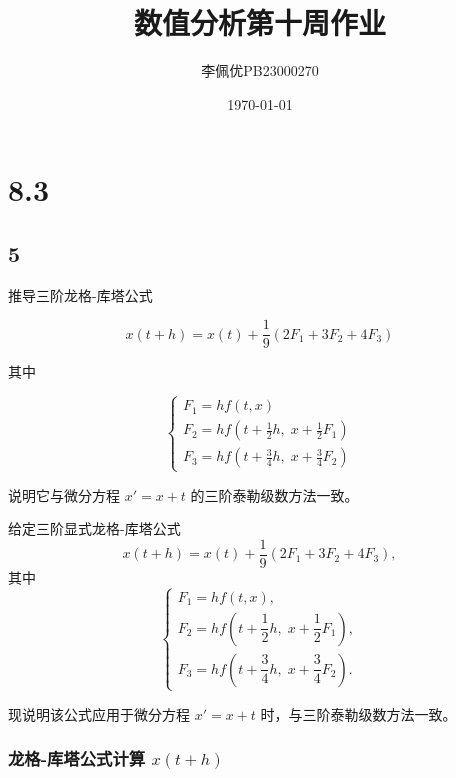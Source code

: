 \documentclass{article}
\title{数值分析第十周作业}
\date{\today}
\author{李佩优PB23000270}
\begin{document}
\maketitle

\section*{8.3}
\subsection*{5}

推导三阶龙格-库塔公式

\[
x(t+h) = x(t) + \frac{1}{9}(2F_1 + 3F_2 + 4F_3)
\]

其中

\[
\begin{cases} 
F_1 = hf(t,x) \\[4pt]
F_2 = hf\!\left(t+\frac{1}{2}h,\; x + \frac{1}{2}F_1\right) \\[4pt]
F_3 = hf\!\left(t+\frac{3}{4}h,\; x + \frac{3}{4}F_2\right)
\end{cases}
\]

说明它与微分方程 \(x' = x + t\) 的三阶泰勒级数方法一致。



给定三阶显式龙格-库塔公式
\begin{equation}\label{eq:rk3}
x(t+h) = x(t) + \frac{1}{9}(2F_1 + 3F_2 + 4F_3),
\end{equation}
其中
\[
\begin{cases}
F_1 = h f(t,x), \\[4pt]
F_2 = h f\!\left(t+\dfrac{1}{2}h,\; x + \dfrac{1}{2}F_1\right), \\[10pt]
F_3 = h f\!\left(t+\dfrac{3}{4}h,\; x + \dfrac{3}{4}F_2\right).
\end{cases}
\]

现说明该公式应用于微分方程 $x' = x + t$ 时，与三阶泰勒级数方法一致。

\subsubsection*{龙格-库塔公式计算 $x(t+h)$}
\end{document}
